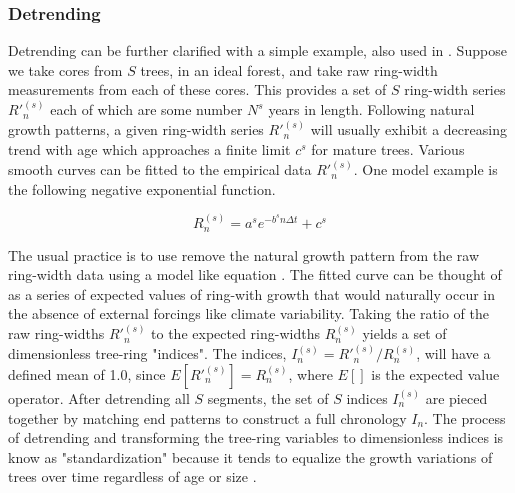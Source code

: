 \documentclass[phd,tocprelim]{cornell}
\begin{document}
\subsubsection{Detrending}\label{detrending}
Detrending can be further clarified with a simple example, also used in 
\cite{cook1995segment}. Suppose we take cores from $S$ trees, in an ideal 
forest, and take raw ring-width measurements from each of these cores. 
This provides a set of $S$ ring-width series ${R'}_n^{(s)}$ each of which 
are some number $N^s$ years in length. Following natural growth patterns,
a given ring-width series ${R'}_n^{(s)}$ will usually exhibit a decreasing 
trend with age which approaches a finite limit $c^s$ for mature trees. 
Various smooth curves can be fitted to the empirical data ${R'}_n^{(s)}$. 
One model example is the following negative exponential function.

\begin{equation}
{R}_{n}^{(s)} = a^s e^{-b^s n \Delta t}+c^s
\label{negexp}
\end{equation}

The usual practice is to use remove the natural growth pattern from
the raw ring-width data using a model like equation  
\cite{cook1995segment}. The fitted curve can be thought of as a 
series of expected values of ring-with growth that would naturally occur 
in the absence of external forcings like climate variability. Taking 
the ratio of the raw ring-widths ${{R'}_n^{(s)}}$ to the expected 
ring-widths ${{R}_{n}^{(s)}}$ yields a set of dimensionless tree-ring 
"indices". The indices, $I_n^{(s)} = {R'}_n^{(s)} / {R}_n^{(s)}$, 
will have a defined mean of 1.0, since $E[{R'}_n^{(s)}]={R}_{n}^{(s)}$, 
where $E[]$ is the expected value operator. After detrending
all $S$ segments, the set of $S$ indices $I_n^{(s)}$ are pieced together 
by matching end patterns to construct a full chronology $I_n$. 
The process of detrending and transforming the tree-ring variables 
to dimensionless indices is know as "standardization" because it 
tends to equalize the growth variations of trees over time regardless 
of age or size \cite{cook1995segment}.
\end{document}
